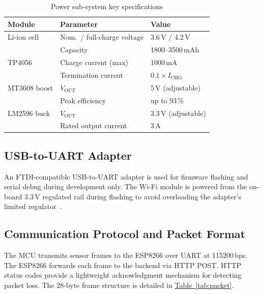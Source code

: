 \documentclass[conference]{IEEEtran}
\newcommand{\TabLink}[1]{\hyperref[#1]{Table~\ref*{#1}}}
\begin{document}
\begin{table}[!t]
  \centering\caption{Power sub-system key specifications}\label{tab:power_specs}
  \begin{tabularx}{\columnwidth}{@{}llX@{}}
    \toprule Module & Parameter & Value \\\midrule
    Li-ion cell  & Nom.\ / full-charge voltage & 3.6\,V / 4.2\,V \\
                 & Capacity                    & 1800--3500\,mAh \\
    TP4056       & Charge current (max)        & 1000\,mA \\
                 & Termination current         & $0.1\times I_\text{CHG}$ \\
    MT3608 boost & $V_\text{OUT}$              & 5\,V (adjustable) \\
                 & Peak efficiency             & up to 93\,\% \\
    LM2596 buck  & $V_\text{OUT}$              & 3.3\,V (adjustable) \\
                 & Rated output current        & 3\,A \\
    \bottomrule
  \end{tabularx}
\end{table}

\subsection{USB-to-UART Adapter}

An FTDI-compatible USB-to-UART adapter is used for firmware flashing and
serial debug during development only. The Wi-Fi module is powered from the
on-board 3.3\,V regulated rail during flashing to avoid overloading the
adapter's limited regulator~\cite{ft232rl}.

\subsection{Communication Protocol and Packet Format}

The MCU transmits sensor frames to the ESP8266 over UART at 115200\,bps.
The ESP8266 forwards each frame to the backend via HTTP POST. HTTP status
codes provide a lightweight acknowledgment mechanism for detecting packet loss.
The 28-byte frame structure is detailed in \TabLink{tab:packet}.
\end{document}
